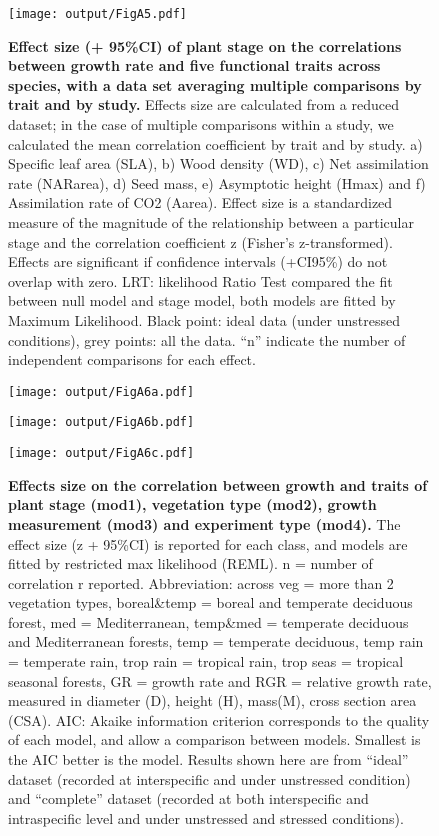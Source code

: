 \documentclass[a4paper]{article}\usepackage[]{graphicx}\usepackage[]{color}
\begin{document}
\begin{appendices}
\begin{figure}[h!]
\centering
\texttt{[image: output/FigA5.pdf]}
\caption{\textbf{Effect size (+ 95\%CI) of plant stage on the correlations between growth rate and five functional traits across species, with a data set averaging multiple comparisons by trait and by study.} Effects size are calculated from a reduced dataset; in the case of multiple comparisons within a study, we calculated the mean correlation coefficient by trait and by study. a) Specific leaf area (SLA), b) Wood density (WD), c) Net assimilation rate (NARarea), d) Seed mass, e) Asymptotic height (Hmax) and f) Assimilation rate of CO2 (Aarea). Effect size is a standardized measure of the magnitude of the relationship between a particular stage and the correlation coefficient z (Fisher's z-transformed). Effects are significant if confidence intervals (+CI95\%) do not overlap with zero. LRT: likelihood Ratio Test compared the fit between null model and stage model, both models are fitted by Maximum Likelihood. Black point: ideal data (under unstressed conditions), grey points: all the data. ``n'' indicate the number of independent comparisons for each effect.}
\label{fig:figA5}
\end{figure}


\begin{figure}[h!]
\centering
\texttt{[image: output/FigA6a.pdf]}
\end{figure}

\begin{figure}[h!]
\centering
\texttt{[image: output/FigA6b.pdf]}
\end{figure}

\begin{figure}[h!]
\centering
\texttt{[image: output/FigA6c.pdf]}
\caption{\textbf{Effects size on the correlation between growth and traits of plant stage (mod1), vegetation type (mod2), growth measurement (mod3) and experiment type (mod4).} The effect size (z + 95\%CI) is reported for each class, and models are fitted by restricted max likelihood (REML). n = number of correlation r reported. Abbreviation: across veg = more than 2 vegetation types, boreal\&temp = boreal and temperate deciduous forest, med = Mediterranean,  temp\&med = temperate deciduous and Mediterranean forests, temp = temperate deciduous, temp rain = temperate rain, trop rain = tropical rain, trop seas = tropical seasonal forests, GR = growth rate and RGR = relative growth rate, measured in diameter (D), height (H), mass(M), cross section area (CSA). AIC: Akaike information criterion corresponds to the quality of each model, and allow a comparison between models. Smallest is the AIC better is the model. Results shown here are from ``ideal'' dataset (recorded at interspecific and under unstressed condition) and ``complete'' dataset (recorded at both interspecific and intraspecific level and under unstressed and stressed conditions).}
\label{fig:figA6}
\end{figure}


\end{appendices}
\end{document}

